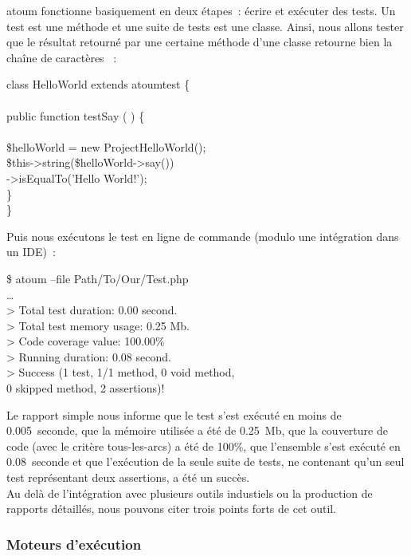 atoum fonctionne basiquement en deux étapes~: écrire et exécuter des tests. Un
test est une méthode et une suite de tests est une classe. Ainsi, nous allons
tester que le résultat retourné par une certaine méthode  d'une classe
 retourne bien la chaîne de caractères
~:
%
\begin{pre}
class HelloWorld extends \bslash{}atoum\bslash{}test \{ \\
 \\
    public function testSay ( ) \{ \\
 \\
        \$helloWorld = new \bslash{}Project\bslash{}HelloWorld(); \\
        \$this->string(\$helloWorld->say()) \\
                  ->isEqualTo('Hello World!'); \\
    \} \\
\}
\end{pre}
%
Puis nous exécutons le test en ligne de commande (modulo une intégration dans un
IDE)~:
%
\begin{pre}
\$ atoum --file Path/To/Our/Test.php \\
… \\
> Total test duration: 0.00 second. \\
> Total test memory usage: 0.25 Mb. \\
> Code coverage value: 100.00\% \\
> Running duration: 0.08 second. \\
> Success (1 test, 1/1 method, 0 void method, \\
           0 skipped method, 2 assertions)!
\end{pre}
%
Le rapport simple nous informe que le test s'est exécuté en moins de
0.005~seconde, que la mémoire utilisée a été de 0.25~Mb, que la couverture de
code (avec le critère tous-les-arcs) a été de 100\%, que l'ensemble s'est
exécuté en 0.08~seconde et que l'exécution de la seule suite de tests, ne
contenant qu'un seul test représentant deux assertions, a été un succès. \\

Au delà de l'intégration avec plusieurs outils industiels ou la production de
rapports détaillés, nous pouvons citer trois points forts de cet outil.

\subsubsection{Moteurs d'exécution}

